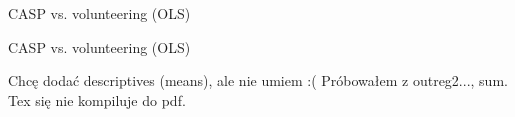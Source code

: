 \documentclass[10pt, letterpaper]{article}
\begin{document}
\begin{spacing}{1.4}
\begin{spacing}{.9}

\begin{spacing}{.9}
	 
      \label{tauH} 
\end{spacing}

\begin{spacing}{.9}
	 
      \label{tauLS} 
\end{spacing}



\begin{spacing}{.9}
\begin{table}[H]
\centering 
\caption{CASP vs. volunteering (OLS)}  
\begin{scriptsize} 
	 
      \label{SepMod} 
\end{scriptsize}
\end{table}
\end{spacing}

\begin{spacing}{.9}
\begin{table}[H]
\centering 
\caption{CASP vs. volunteering (OLS)}  
\begin{scriptsize} 
	 
      \label{SepMod1} 
\end{scriptsize}
\end{table}
\end{spacing}


%	 

Chcę dodać descriptives (means), ale nie umiem :( Próbowałem z outreg2..., sum. Tex się nie kompiluje do pdf.





\end{spacing}
\end{spacing}
\end{document}
